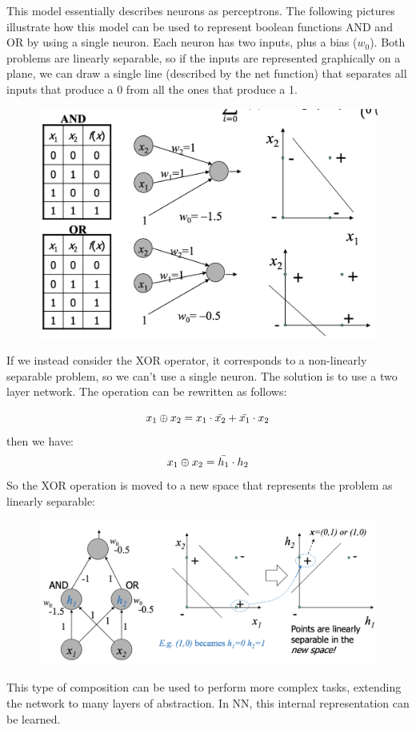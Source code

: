 This model essentially describes neurons as perceptrons. The following pictures illustrate how this model can be used to represent boolean functions AND and OR by using a single neuron. Each neuron has two inputs, plus a bias ($w_0$). Both problems are linearly separable, so if the inputs are represented graphically on a plane, we can draw a single line (described by the net function) that separates all inputs that produce a 0 from all the ones that produce a 1.

\begin{figure}[h]
    \centering
    \includegraphics[width=0.5\linewidth]{img/boolean perceptron.png}
\end{figure}

If we instead consider the XOR operator, it corresponds to a non-linearly separable problem, so we can't use a single neuron. The solution is to use a two layer network. The operation can be rewritten as follows:

\begin{equation*}
    x_1 \oplus x_2 = x_1 \cdot \Bar{x_2} + \Bar{x_1} \cdot x_2
\end{equation*}
then we have:
\begin{equation*}
    x_1 \oplus x_2 = \Bar{h_1} \cdot h_2
\end{equation*}
So the XOR operation is moved to a new space that represents the problem as linearly separable:

\begin{figure}[h]
    \centering
    \includegraphics[width=0.5\linewidth]{img/xor perceptron.png}
\end{figure}
This type of composition can be used to perform more complex tasks, extending the network to many layers of abstraction. In NN, this internal representation can be learned.

